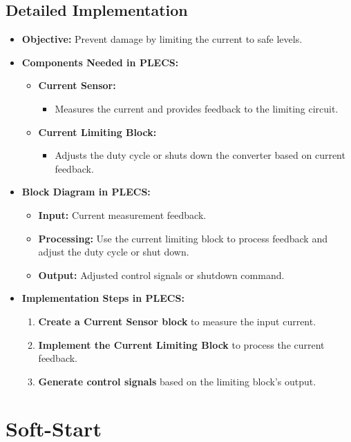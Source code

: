 \documentclass{article}
\begin{document}
\subsection{Detailed Implementation}
\begin{itemize}
    \item \textbf{Objective:} Prevent damage by limiting the current to safe levels.
    \item \textbf{Components Needed in PLECS:}
    \begin{itemize}
        \item \textbf{Current Sensor:}
        \begin{itemize}
            \item Measures the current and provides feedback to the limiting circuit.
        \end{itemize}
        \item \textbf{Current Limiting Block:}
        \begin{itemize}
            \item Adjusts the duty cycle or shuts down the converter based on current feedback.
        \end{itemize}
    \end{itemize}
    \item \textbf{Block Diagram in PLECS:}
    \begin{itemize}
        \item \textbf{Input:} Current measurement feedback.
        \item \textbf{Processing:} Use the current limiting block to process feedback and adjust the duty cycle or shut down.
        \item \textbf{Output:} Adjusted control signals or shutdown command.
    \end{itemize}
    \item \textbf{Implementation Steps in PLECS:}
    \begin{enumerate}
        \item \textbf{Create a Current Sensor block} to measure the input current.
        \item \textbf{Implement the Current Limiting Block} to process the current feedback.
        \item \textbf{Generate control signals} based on the limiting block's output.
    \end{enumerate}
\end{itemize}

\section{Soft-Start}
\label{sec:soft_start}
\end{document}
